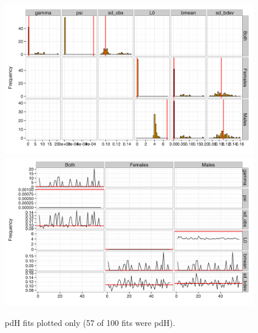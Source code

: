 \documentclass[11pt, a4paper]{article}
\begin{document}
\begin{figure}[!htbp]
  \centering
  \includegraphics[width=\linewidth]{../simulation/sims2/results/SimPars.png}
  \includegraphics[width=\linewidth]{../simulation/sims2/results/TracePars.png}
  \begin{quote}
    \caption{pdH fits plotted only (57 of 100 fits were pdH).}
  \label{fig:}
  \end{quote}
\end{figure}
\end{document}

